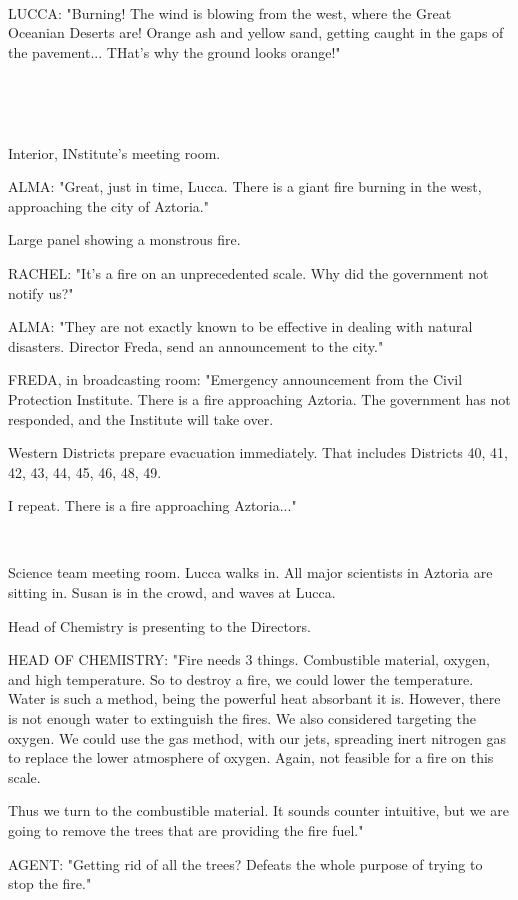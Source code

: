 \documentclass[11pt]{article}
\begin{document}
\ 

LUCCA: "Burning!
The wind is blowing from the west, where the Great Oceanian Deserts are! 
Orange ash and yellow sand, getting caught in the gaps of the pavement...
THat's why the ground looks orange!"

\ 

\ 

Interior, INstitute's meeting room.

ALMA: "Great, just in time, Lucca. 
There is a giant fire burning in the west, approaching the city of Aztoria."

Large panel showing a monstrous fire.

RACHEL: "It's a fire on an unprecedented scale. Why did the government not notify us?"

ALMA: "They are not exactly known to be effective in dealing with natural disasters. Director Freda, send an announcement to the city."

FREDA, in broadcasting room: "Emergency announcement from the Civil Protection Institute. 
There is a fire approaching Aztoria.
The government has not responded, and the Institute will take over.

Western Districts prepare evacuation immediately. 
That includes Districts 40, 41, 42, 43, 44, 45, 46, 48, 49.

I repeat. 
There is a fire approaching Aztoria..."

\ 

Science team meeting room. 
Lucca walks in.
All major scientists in Aztoria are sitting in. 
Susan is in the crowd, and waves at Lucca.

Head of Chemistry is presenting to the Directors.

HEAD OF CHEMISTRY: "Fire needs 3 things.
Combustible material, oxygen, and high temperature.
So to destroy a fire, we could lower the temperature.
Water is such a method, being the powerful heat absorbant it is.
However, there is not enough water to extinguish the fires.
We also considered targeting the oxygen.
We could use the gas method, with our jets, spreading inert nitrogen gas to replace the lower atmosphere of oxygen.
Again, not feasible for a fire on this scale.

Thus we turn to the combustible material.
It sounds counter intuitive, but we are going to remove the trees that are providing the fire fuel."

AGENT: "Getting rid of all the trees? Defeats the whole purpose of trying to stop the fire."
\end{document}
